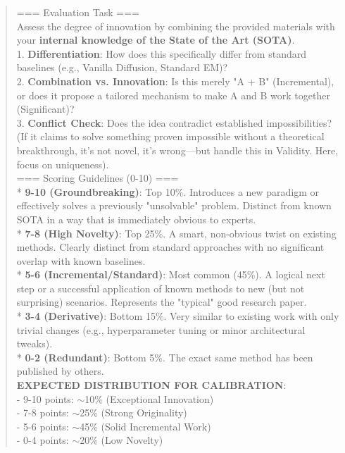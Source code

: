 \begin{quote}
\begin{tcolorbox}[breakable,colback=eval!20!white, colframe=eval!60!black, title=\textbf{Prompt for Evaluation Agent - Novelty}]
        === Evaluation Task ===\\
        Assess the degree of innovation by combining the provided materials with your \textbf{internal knowledge of the State of the Art (SOTA)}.\\

        1.  \textbf{Differentiation}: How does this specifically differ from standard baselines (e.g., Vanilla Diffusion, Standard EM)?\\
        2.  \textbf{Combination vs. Innovation}: Is this merely "A + B" (Incremental), or does it propose a tailored mechanism to make A and B work together (Significant)?\\
        3.  \textbf{Conflict Check}: Does the idea contradict established impossibilities? (If it claims to solve something proven impossible without a theoretical breakthrough, it's not novel, it's wrong—but handle this in Validity. Here, focus on uniqueness).\\

        === Scoring Guidelines (0-10) ===\\
        * \textbf{9-10 (Groundbreaking)}: Top 10\%. Introduces a new paradigm or effectively solves a previously "unsolvable" problem. Distinct from known SOTA in a way that is immediately obvious to experts.\\
        * \textbf{7-8 (High Novelty)}: Top 25\%. A smart, non-obvious twist on existing methods. Clearly distinct from standard approaches with no significant overlap with known baselines.\\
        * \textbf{5-6 (Incremental/Standard)}: Most common (45\%). A logical next step or a successful application of known methods to new (but not surprising) scenarios. Represents the "typical" good research paper.\\
        * \textbf{3-4 (Derivative)}: Bottom 15\%. Very similar to existing work with only trivial changes (e.g., hyperparameter tuning or minor architectural tweaks).\\
        * \textbf{0-2 (Redundant)}: Bottom 5\%. The exact same method has been published by others.\\

        \textbf{EXPECTED DISTRIBUTION FOR CALIBRATION}:\\
        - 9-10 points: $\sim$10\% (Exceptional Innovation)\\
        - 7-8 points: $\sim$25\% (Strong Originality)\\
        - 5-6 points: $\sim$45\% (Solid Incremental Work)\\
        - 0-4 points: $\sim$20\% (Low Novelty)\\


\end{tcolorbox}
\end{quote}
